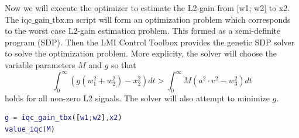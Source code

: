 \documentclass{article}[12pt]
\begin{document}
\noindent Now we will execute the optimizer to estimate the L2-gain from [w1; w2] to x2. The $\text{iqc\_gain\_tbx.m}$ script will form an optimization problem which corresponds to the worst case L2-gain estimation problem. This formed as a semi-definite program (SDP). Then the LMI Control Toolbox provides the genetic SDP solver to solve the optimization problem. More explicity, the solver will choose the variable parameters $M$ and $g$ so that 
\begin{equation*}
    \int^\infty_0 (g(w_1^2 + w_2^2) - x_2^2) dt > \int_0^\infty M(a^2 \cdot v^2 - w_3^2)dt
\end{equation*}
holds for all non-zero L2 signals. The solver will also attempt to minimize $g$. 

\begin{lstlisting}[language=MatLab]
%run solver to find values for g and M
g = iqc_gain_tbx([w1;w2],x2)
value_iqc(M)
\end{lstlisting}
\end{document}
